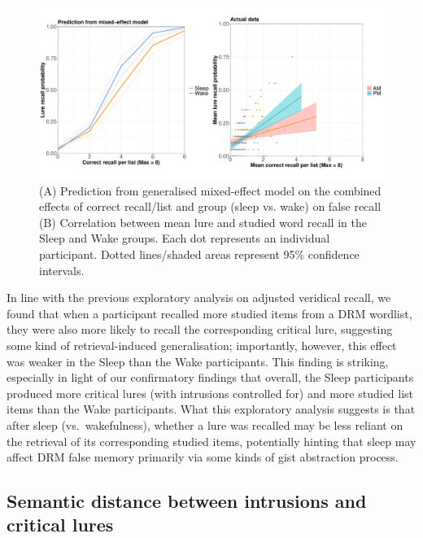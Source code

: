 \documentclass[
]{article}
\begin{document}
\begin{figure}

{\centering \includegraphics{Figures/delaygraph} 

}

\caption{(A) Prediction from generalised mixed-effect model on the combined effects of correct recall/list and group (sleep vs. wake) on false recall (B) Correlation between mean lure and studied word recall in the Sleep and Wake groups. Each dot represents an individual participant. Dotted lines/shaded areas represent 95\% confidence intervals.}\label{fig:delayfig}
\end{figure}

In line with the previous exploratory analysis on adjusted veridical recall, we found that when a participant recalled more studied items from a DRM wordlist, they were also more likely to recall the corresponding critical lure, suggesting some kind of retrieval-induced generalisation; importantly, however, this effect was weaker in the Sleep than the Wake participants. This finding is striking, especially in light of our confirmatory findings that overall, the Sleep participants produced more critical lures (with intrusions controlled for) and more studied list items than the Wake participants. What this exploratory analysis suggests is that after sleep (vs.~wakefulness), whether a lure was recalled may be less reliant on the retrieval of its corresponding studied items, potentially hinting that sleep may affect DRM false memory primarily via some kinds of gist abstraction process.

\hypertarget{semantic-distance-between-intrusions-and-critical-lures}{%
\subsection{Semantic distance between intrusions and critical lures}\label{semantic-distance-between-intrusions-and-critical-lures}}
\end{document}
